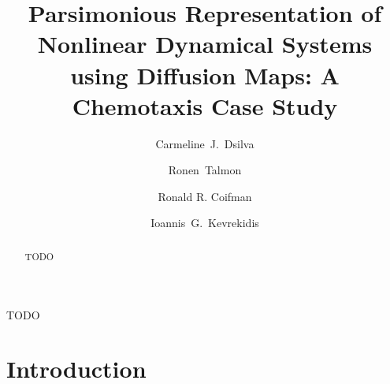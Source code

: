 \documentclass[preprint]{elsarticle}
\begin{document}
\begin{frontmatter}

\title{Parsimonious Representation of Nonlinear Dynamical Systems using Diffusion Maps: A Chemotaxis Case Study}

\author[princeton]{Carmeline~J.~Dsilva}
%
\author[technion]{Ronen~Talmon}
%
\author[yale]{Ronald R. Coifman}
%
\author[princeton, princetonpacm]{Ioannis~G.~Kevrekidis }
%
\address[princeton]{Department of Chemical and Biological Engineering, Princeton University, Princeton, NJ, 08540, USA}
\address[technion]{Technion - Israel Institute of Technology, Haifa, 3200003, Israel}
\address[yale]{Department of Mathematics, Yale University, New Haven, CT, 06520, USA}
\address[princetonpacm]{Program in Applied and Computational Mathematics, Princeton University, Princeton, NJ, 08540, USA}
%


\begin{abstract}

TODO
\end{abstract}


\begin{keyword}
TODO
\end{keyword}

\end{frontmatter}


\section{Introduction}
\end{document}
